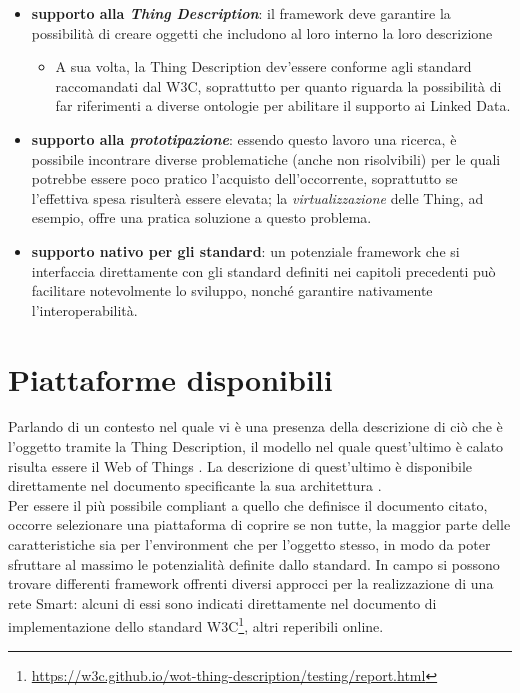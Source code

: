 \documentclass[12pt,a4paper,openright,oneside]{report}
\begin{document}
\begin{itemize}
	\setlength\itemsep{0em}
	\item \textbf{supporto alla \textit{Thing Description}}: il framework deve garantire la possibilità di creare oggetti che includono al loro interno la loro descrizione
	\begin{itemize}
		\setlength\itemsep{0em}
		\item A sua volta, la Thing Description dev'essere conforme agli standard raccomandati dal W3C, soprattutto per quanto riguarda la possibilità di far riferimenti a diverse ontologie per abilitare il supporto ai Linked Data.
	\end{itemize}

	\item \textbf{supporto alla \textit{prototipazione}}: essendo questo lavoro una ricerca, è possibile incontrare diverse problematiche (anche non risolvibili) per le quali potrebbe essere poco pratico l'acquisto dell'occorrente, soprattutto se l'effettiva spesa risulterà essere elevata; la \textit{virtualizzazione} delle Thing, ad esempio, offre una pratica soluzione a questo problema.
	
	\item \textbf{supporto nativo per gli standard}: un potenziale framework che si interfaccia direttamente con gli standard definiti nei capitoli precedenti può facilitare notevolmente lo sviluppo, nonché garantire nativamente l'interoperabilità.
\end{itemize}

\section{Piattaforme disponibili}
Parlando di un contesto nel quale vi è una presenza della descrizione di ciò che è l'oggetto tramite la Thing Description, il modello nel quale quest'ultimo è calato risulta essere il Web of Things \cite{wot}. La descrizione di quest'ultimo è disponibile direttamente nel documento specificante la sua architettura \cite{wot-architecture}.\\

Per essere il più possibile compliant a quello che definisce il documento citato, occorre selezionare una piattaforma di coprire se non tutte, la maggior parte delle caratteristiche sia per l'environment che per l'oggetto stesso, in modo da poter sfruttare al massimo le potenzialità definite dallo standard. In campo si possono trovare differenti framework offrenti diversi approcci per la realizzazione di una rete Smart: alcuni di essi sono indicati direttamente nel documento di implementazione dello standard W3C\footnote{\url{https://w3c.github.io/wot-thing-description/testing/report.html}}, altri reperibili online.
\end{document}

